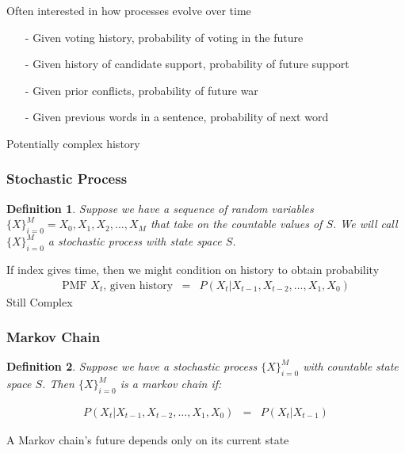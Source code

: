 \documentclass{beamer}
\newtheorem{defn}{Definition}
\numberwithin{equation}{section}
\begin{document}
\begin{frame}

Often interested in how processes evolve over time \pause 
\begin{itemize}
\item[-] Given voting history, probability of voting in the future
\item[-] Given history of candidate support, probability of future support
\item[-] Given prior conflicts, probability of future war
\item[-] Given previous words in a sentence, probability of next word
\end{itemize}

\alert{Potentially complex history}



\end{frame}


\begin{frame}
\frametitle{Stochastic Process}

\begin{defn}
Suppose we have a sequence of random variables $\{X\}_{i=0}^{M} = X_{0}, X_{1}, X_{2}, \hdots, X_{M}$ that take on the countable values of $S$.  We will call $\{X\}_{i=0}^{M}$ a stochastic process with state space $S$.  
\end{defn}

If index gives time, then we might condition on history to obtain probability
\begin{eqnarray}
\text{PMF $X_{t}$, given history} & = & P(X_{t} | X_{t-1}, X_{t-2}, \hdots, X_{1}, X_{0}) \nonumber 
\end{eqnarray}
\alert{Still Complex}

\end{frame}


\begin{frame}
\frametitle{Markov Chain}

\begin{defn}
Suppose we have a stochastic process $\{X\}_{i=0}^{M}$ with countable state space $S$.  Then $\{X\}_{i=0}^{M}$ is a markov chain if: 

\begin{eqnarray}
P(X_{t} | X_{t-1}, X_{t-2}, \hdots, X_{1}, X_{0}) & =& P(X_{t}| X_{t-1})\nonumber 
\end{eqnarray}

\end{defn}

A Markov chain's future depends only on its current state

\end{frame}
\end{document}
